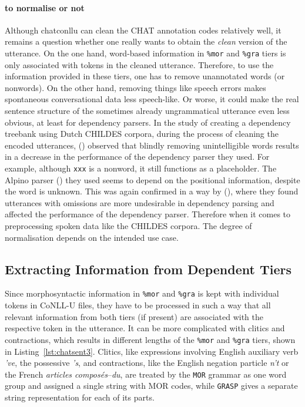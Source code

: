 \paragraph{to normalise or not} Although chatconllu can clean the CHAT annotation codes relatively well, it remains a question whether one really wants to obtain the \emph{clean} version of the utterance. On the one hand, word-based information in \texttt{\%mor} and \texttt{\%gra} tiers is only associated with tokens in the cleaned utterance. Therefore, to use the information provided in these tiers, one has to remove unannotated words (or nonwords). On the other hand, removing things like speech errors makes spontaneous conversational data less speech-like. Or worse, it could make the real sentence structure of the sometimes already ungrammatical utterance even less obvious, at least for dependency parsers. In the study of creating a dependency treebank using Dutch CHILDES corpora, during the process of cleaning the encoded utterances, (\cite{odijk2018anncor}) observed that blindly removing unintelligible words results in a decrease in the performance of the dependency parser they used. For example, although \texttt{xxx} is a nonword, it still functions as a placeholder. The Alpino parser (\cite{bouma}) they used seems to depend on the positional information, despite the word is unknown. This was again confirmed in a way by (\cite{liu2021}), where they found utterances with omissions are more undesirable in dependency parsing and affected the performance of the dependency parser. Therefore when it comes to preprocessing spoken data like the CHILDES corpora. The degree of normalisation depends on the intended use case.

\subsection{Extracting Information from Dependent Tiers}

Since morphosyntactic information in \texttt{\%mor} and \texttt{\%gra} is kept with individual tokens in CoNLL-U files, they have to be processed in such a way that all relevant information from both tiers (if present) are associated with the respective token in the utterance. It can be more complicated with clitics and contractions, which results in different lengths of the \texttt{\%mor} and \texttt{\%gra} tiers, shown in Listing~\ref{lst:chatsent3}. Clitics, like expressions involving English auxiliary verb \emph{'ve}, the possessive \emph{'s}, and contractions, like the English negation particle \emph{n't} or the French \emph{articles composés}--\emph{du}, are treated by the \texttt{MOR} grammar as one word group and assigned a single string with MOR codes, while \texttt{GRASP} gives a separate string representation for each of its parts.\\

